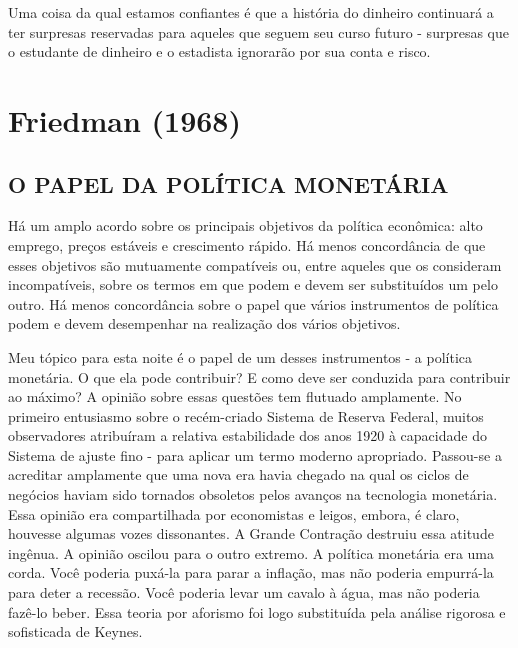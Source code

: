 \documentclass[12pt]{article}
\begin{document}
Uma coisa da qual estamos confiantes é que a história do dinheiro continuará a ter surpresas reservadas para aqueles que seguem seu curso futuro - surpresas que o estudante de dinheiro e o estadista ignorarão por sua conta e risco.

\section{\textbf{Friedman (1968)}}
\subsection{\textbf{O PAPEL DA POLÍTICA MONETÁRIA}}

Há um amplo acordo sobre os principais objetivos da política econômica: alto emprego, preços estáveis e crescimento rápido. Há menos concordância de que esses objetivos são mutuamente compatíveis ou, entre aqueles que os consideram incompatíveis, sobre os termos em que podem e devem ser substituídos um pelo outro. Há menos concordância sobre o papel que vários instrumentos de política podem e devem desempenhar na realização dos vários objetivos.

Meu tópico para esta noite é o papel de um desses instrumentos - a política monetária. O que ela pode contribuir? E como deve ser conduzida para contribuir ao máximo? A opinião sobre essas questões tem flutuado amplamente. No primeiro entusiasmo sobre o recém-criado Sistema de Reserva Federal, muitos observadores atribuíram a relativa estabilidade dos anos 1920 à capacidade do Sistema de ajuste fino - para aplicar um termo moderno apropriado. Passou-se a acreditar amplamente que uma nova era havia chegado na qual os ciclos de negócios haviam sido tornados obsoletos pelos avanços na tecnologia monetária. Essa opinião era compartilhada por economistas e leigos, embora, é claro, houvesse algumas vozes dissonantes. A Grande Contração destruiu essa atitude ingênua. A opinião oscilou para o outro extremo. A política monetária era uma corda. Você poderia puxá-la para parar a inflação, mas não poderia empurrá-la para deter a recessão. Você poderia levar um cavalo à água, mas não poderia fazê-lo beber. Essa teoria por aforismo foi logo substituída pela análise rigorosa e sofisticada de Keynes.
\end{document}
